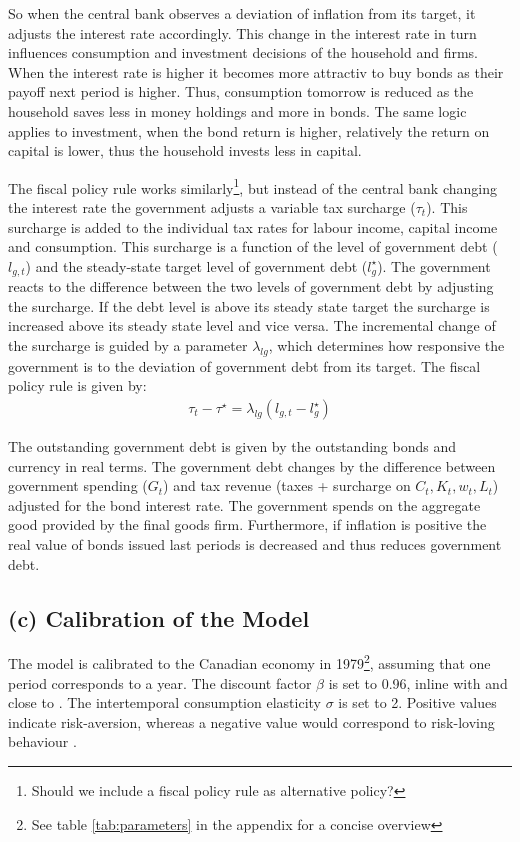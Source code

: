 \documentclass[12pt]{article}
\begin{document}
So when the central bank observes a deviation of inflation from its target, it adjusts the interest rate accordingly. This change in the interest rate in turn influences consumption and investment decisions of the household and firms. When the interest rate is higher it becomes more attractiv to buy bonds as their payoff next period is higher. Thus, consumption tomorrow is reduced as the household saves less in money holdings and more in bonds. The same logic applies to investment, when the bond return is higher, relatively the return on capital is lower, thus the household invests less in capital.

The fiscal policy rule works similarly\footnote{Should we include a fiscal policy rule as alternative policy?}, but instead of the central bank changing the interest rate the government adjusts a variable tax surcharge ($\tau_t$). This surcharge is added to the individual tax rates for labour income, capital income and consumption. This surcharge is a function of the level of government debt ($l_{g,t}$) and the steady-state target level of government debt ($l^{\star}_{g}$). The government reacts to the difference between the two levels of government debt by adjusting the surcharge. If the debt level is above its steady state target the surcharge is increased above its steady state level and vice versa. The incremental change of the surcharge is guided by a parameter $\lambda_{l g}$, which determines how responsive the government is to the deviation of government debt from its target. The fiscal policy rule is given by:
\begin{align}
    \tau_t - \tau^{\star} = \lambda_{l g} (l_{g,t} - l^{\star}_{g})
\end{align}

The outstanding government debt is given by the outstanding bonds and currency in real terms. The government debt changes by the difference between government spending ($G_t$) and tax revenue (taxes + surcharge on $C_t, K_t, w_t,L_t$) adjusted for the bond interest rate. The government spends on the aggregate good provided by the final goods firm. Furthermore, if inflation is positive the real value of bonds issued last periods is decreased and thus reduces government debt.


\subsection*{(c) Calibration of the Model}
The model is calibrated to the Canadian economy in 1979\footnote{See table \ref{tab:parameters} in the appendix for a concise overview}, assuming that one period corresponds to a year. 
The discount factor $\beta$ is set to 0.96, inline with \textcite{someOilDemandSupply2023} and close to \textcite{corriganToTEMIIIBank2021}. 
The intertemporal consumption elasticity $\sigma$ is set to 2. Positive values indicate risk-aversion, whereas a negative value would correspond to risk-loving behaviour
\parencite{thimmeIntertemporalSubstitutionConsumption2017}.
\end{document}
